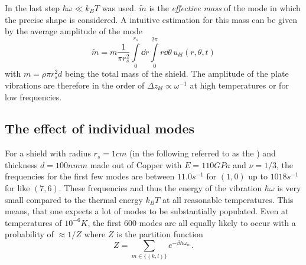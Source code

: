 In the last step $\hbar\omega \ll k_B T$ was used. $\tilde{m}$ is the \textit{effective mass} of the mode in which the precise shape is considered. A intuitive estimation for this mass can be given by the average amplitude of the mode 
\begin{equation}\label{eq:5:effective-mass}
  \tilde{m} = m\frac{1}{\pi r_s^2}\int\limits_0^{r_s} \dd r \int\limits_0^{2\pi} r\dd\theta \, u_{kl}(r, \theta, t)
\end{equation}
with $m=\rho \pi r_s^2 d$ being the total mass of the shield.
The amplitude of the plate vibrations are therefore in the order of $\Delta z_{kl} \propto \omega^{-1}$ at high temperatures or for low frequencies.




\subsection*{The effect of individual modes}
For a shield with radius $r_s = 1\si{cm}$ (in the following referred to as the ) and thickness $d=100\si{nmm}$ made out of Copper with $E = 110\si{GPa}$ and $\nu = 1/3$, the frequencies for the first few modes are between $11.0\si{s^{-1}}$ for $(1,0)$ up to $1018\si{s^{-1}}$ for like $(7,6)$.
These frequencies and thus the energy of the vibration $\hbar \omega$ is very small compared to the thermal energy $k_B T$ at all reasonable temperatures.
This means, that one expects a lot of modes to be substantially populated. Even at temperatures of $10^{-6} \si{K}$, the first $600$ modes are all equally likely to occur with a probability of $\approx 1/Z$ where $Z$ is the partition function
\begin{equation}
  Z = \sum_{m\in\{(k,l)\}} e^{-\beta \hbar \omega_m} .
\end{equation}

